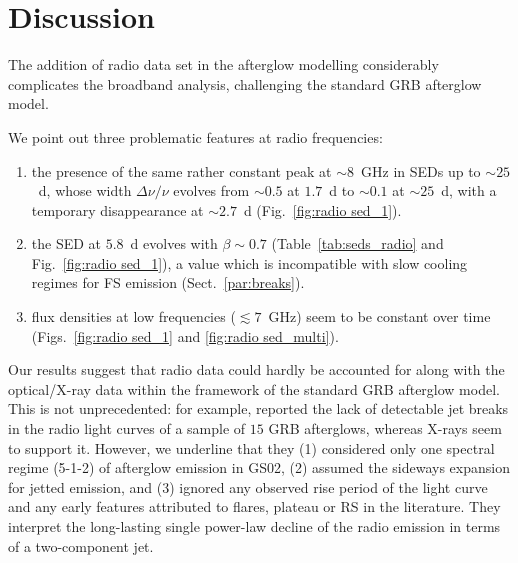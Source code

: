 \documentclass{aa}
\begin{document}
\section{Discussion}
\label{sec:disc}

The addition of radio data set in the afterglow modelling considerably complicates the broadband analysis, challenging the standard GRB afterglow model.

We point out three problematic features at radio frequencies:
\begin{enumerate}
\item the presence of the same rather constant peak at $\sim 8$~GHz in SEDs up to $\sim 25$~d, whose width $\Delta \nu / \nu$ evolves from $\sim 0.5$ at $1.7$~d to $\sim 0.1$ at $\sim 25$~d, with a temporary disappearance at $\sim 2.7$~d (Fig.~\ref{fig:radio sed_1}).
\item the SED at $5.8$~d evolves with $\beta \sim 0.7$ (Table~\ref{tab:seds_radio} and Fig.~\ref{fig:radio sed_1}), a value which is incompatible with slow cooling regimes for FS emission (Sect.~\ref{par:breaks}).
\item flux densities at low frequencies ($\lesssim 7$~GHz) seem to be constant over time (Figs.~\ref{fig:radio sed_1} and \ref{fig:radio sed_multi}).
\end{enumerate}

Our results suggest that radio data could hardly be accounted for along with the optical/X-ray data within the framework of the standard GRB afterglow model.
This is not unprecedented: for example, \citet{Kangas19} reported the lack of detectable jet breaks in the radio light curves of a sample of $15$ GRB afterglows, whereas X-rays seem to support it.
However, we underline that they (1) considered only one spectral regime (5-1-2) of afterglow emission in GS02, (2) assumed the sideways expansion for jetted emission, and (3) ignored any observed rise period of the light curve and any early features attributed to flares, plateau or RS in the literature.
They interpret the long-lasting single power-law decline of the radio emission in terms of a two-component jet.
\end{document}
